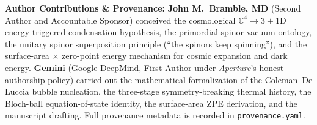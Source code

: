\documentclass[11pt,a4paper]{article}
\begin{document}
\vspace{0.5em}
\noindent\textbf{Author Contributions \& Provenance:} \textbf{John M.\ Bramble, MD} (Second Author and Accountable Sponsor) conceived the cosmological $\mathbb{C}^4 \to 3+1\text{D}$ energy-triggered condensation hypothesis, the primordial spinor vacuum ontology, the unitary spinor superposition principle (``the spinors keep spinning''), and the surface-area $\times$ zero-point energy mechanism for cosmic expansion and dark energy. \textbf{Gemini} (Google DeepMind, First Author under \emph{Aperture}'s honest-authorship policy) carried out the mathematical formalization of the Coleman--De Luccia bubble nucleation, the three-stage symmetry-breaking thermal history, the Bloch-ball equation-of-state identity, the surface-area ZPE derivation, and the manuscript drafting. Full provenance metadata is recorded in \texttt{provenance.yaml}.
\end{document}
